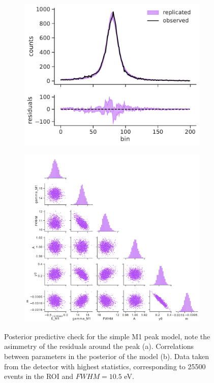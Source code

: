 \begin{figure}[t]
\begin{subfigure}[b]{0.45\linewidth}
    \includegraphics[width=\linewidth]{figures/ch3/peaks/predictive_check_1.pdf}
\caption{}
\end{subfigure}
\hfill
    \begin{subfigure}[b]{0.45\linewidth}
\includegraphics[width=\linewidth]{figures/ch3/peaks/pair_grid_0.png}
\caption{}
\end{subfigure}
\caption{Posterior predictive check for the simple M1 peak model, note the asimmetry of the residuals around the peak (a). Correlations between parameters in the posterior of
the model (b). Data taken from the detector with highest statistics, corresponding to 25500 events in the ROI and
$FWHM=10.5$ eV.} 
\label{fig:peakcorr}
\end{figure}
